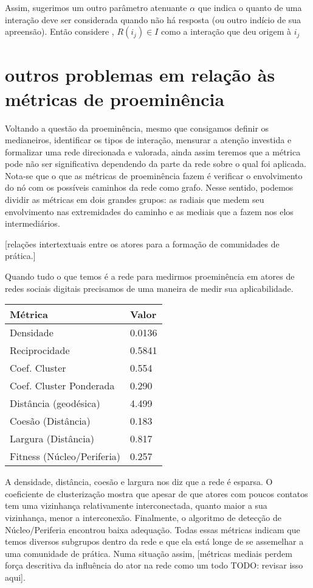 \documentclass{article}
\begin{document}
Assim, sugerimos um outro parâmetro atenuante $\alpha$ que indica o quanto de
uma interação deve ser considerada quando não há resposta (ou outro indício de
sua apreensão). Então considere , $R(i_j) \in I$ como a interação que deu origem à $i_j$ 
\section{outros problemas em relação às métricas de proeminência}

Voltando a questão da proeminência, mesmo que consigamos definir os medianeiros,
identificar os tipos de interação, mensurar a atenção investida e formalizar uma
rede direcionada e valorada, ainda assim teremos que a métrica pode não ser
significativa dependendo da parte da rede sobre o qual foi aplicada. Nota-se que
o que as métricas de proeminência fazem é verificar o envolvimento do nó com os
possíveis caminhos da rede como grafo. Nesse sentido, podemos dividir as
métricas em dois grandes grupos: as radiais que medem seu envolvimento nas
extremidades do caminho e as mediais que a fazem nos elos intermediários.

[relações intertextuais entre os atores para a formação de comunidades de
prática.]

Quando tudo o que temos é a rede para medirmos proeminência em atores de redes
sociais digitais precisamos de uma maneira de medir sua aplicabilidade.


\begin{tabular}{| l | l |}
\hline
Métrica & Valor \\ \hline
Densidade & 0.0136 \\
Reciprocidade & 0.5841 \\
Coef. Cluster & 0.554 \\
Coef. Cluster Ponderada & 0.290 \\
Distância (geodésica) & 4.499 \\
Coesão (Distância) & 0.183 \\
Largura (Distância) & 0.817 \\
Fitness (Núcleo/Periferia) & 0.257 \\
\hline
\end{tabular}

A densidade, distância, coesão e largura nos diz que a rede é esparsa. O
coeficiente de clusterização mostra que apesar de que atores com poucos contatos
tem uma vizinhança relativamente interconectada, quanto maior a sua vizinhança,
menor a interconexão. Finalmente, o algoritmo de detecção de Núcleo/Periferia
encontrou baixa adequação. Todas essas métricas indicam que temos diversos
subgrupos dentro da rede e que ela está longe de se assemelhar a uma comunidade
de prática. Numa situação assim, [métricas mediais perdem força descritiva da
influência do ator na rede como um todo TODO: revisar isso aqui].
\end{document}
